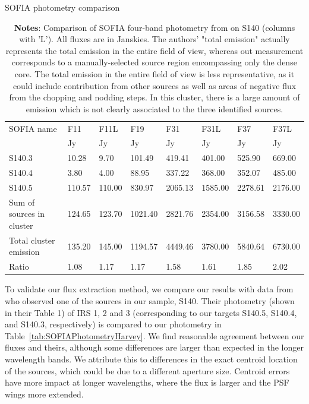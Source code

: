 \renewcommand{\arraystretch}{1.5}
\begin{table}[!h]
\scriptsize
\caption{SOFIA photometry comparison} \label{tab:SOFIAPhotometryHarvey}
\vspace{-0.5cm}
\begin{longtable}{l|P{1cm}P{1cm}|P{1cm}|P{1cm}P{1cm}|P{1cm}P{1cm}}
\toprule															
SOFIA name	&	F11	&	F11L	&	F19	&	F31	&	F31L	&	F37	&	F37L	\\
	&	Jy	&	Jy	&	Jy	&	Jy	&	Jy	&	Jy	&	Jy	\\
\midrule															
S140.3	&	10.28	&	9.70	&	101.49	&	419.41	&	401.00	&	525.90	&	669.00	\\
S140.4	&	3.80	&	4.00	&	88.95	&	337.22	&	368.00	&	352.07	&	485.00	\\
S140.5	&	110.57	&	110.00	&	830.97	&	2065.13	&	1585.00	&	2278.61	&	2176.00	\\
\midrule															
Sum of sources in cluster	&	124.65	&	123.70	&	1021.40	&	2821.76	&	2354.00	&	3156.58	&	3330.00	\\
Total cluster emission	&	135.20	&	145.00	&	1194.57	&	4449.46	&	3780.00	&	5840.64	&	6730.00	\\
Ratio	&	1.08	&	1.17	&	1.17	&	1.58	&	1.61	&	1.85	&	2.02	\\
\bottomrule					
	\end{longtable} 
\caption*{\textbf{Notes}: Comparison of SOFIA four-band photometry from \citet{Harvey:2012kw} on S140 (columns with 'L'). All fluxes are in Janskies. The authors' "total emission" actually represents the total emission in the entire field of view, whereas out measurement corresponds to a manually-selected source region encompassing only the dense core. The total emission in the entire field of view is less representative, as it could include contribution from other sources as well as areas of negative flux from the chopping and nodding steps. In this cluster, there is a large amount of emission which is not clearly associated to the three identified sources.}

\end{table}


To validate our flux extraction method, we compare our results with data from \citet{Harvey:2012kw} who observed one of the sources in our sample, S140. Their photometry (shown in their Table 1) of IRS 1, 2 and 3 (corresponding to our targets S140.5, S140.4, and S140.3, respectively) is compared to our photometry in Table~\ref{tab:SOFIAPhotometryHarvey}. We find reasonable agreement between our fluxes and theirs, although some differences are larger than expected in the longer wavelength bands. We attribute this to differences in the exact centroid location of the sources, which could be due to a different aperture size. Centroid errors have more impact at longer wavelengths, where the flux is larger and the PSF wings more extended.

